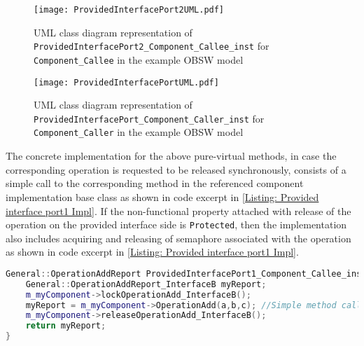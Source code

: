 \begin{figure}[h]
	\centering
	\texttt{[image: ProvidedInterfacePort2UML.pdf]}
	\caption{UML class diagram representation of \texttt{Provided\allowbreak Interface\allowbreak Port2\allowbreak\_Component\allowbreak\_Callee\allowbreak\_inst} for \texttt{Component\allowbreak\_Callee} in the example OBSW model}
	\label{fig: Provided interface port2 UML}
\end{figure}

\begin{figure}[h]
	\centering
	\texttt{[image: ProvidedInterfacePortUML.pdf]}
	\caption{UML class diagram representation of \texttt{Provided\allowbreak Interface\allowbreak Port\allowbreak\_Component\allowbreak\_Caller\allowbreak\_inst} for \texttt{Component\allowbreak\_Caller} in the example OBSW model}
	\label{fig: Provided interface port UML}
\end{figure}   

The concrete implementation for the above pure-virtual methods, in case the corresponding operation is requested to be released synchronously, consists of a simple call to the corresponding method in the referenced component implementation base class as shown in code excerpt in \cref{Listing: Provided interface port1 Impl}. If the non-functional property attached with release of the operation on the provided interface side is \texttt{Protected}, then the implementation also includes acquiring and releasing of semaphore associated with the operation as shown in code excerpt in \cref{Listing: Provided interface port1 Impl}. 

\begin{Listing}
\begin{lstlisting}[language=C++]
General::OperationAddReport ProvidedInterfacePort1_Component_Callee_inst::OperationAdd (const IntegerType& a,const IntegerType& b,IntegerType& c) {
	General::OperationAddReport_InterfaceB myReport;
	m_myComponent->lockOperationAdd_InterfaceB();
	myReport = m_myComponent->OperationAdd(a,b,c); //Simple method call
	m_myComponent->releaseOperationAdd_InterfaceB();
	return myReport;
}
\end{lstlisting}
\caption{Code excerpt from the generated code for operation \texttt{OperationAdd} access in \texttt{Provided\allowbreak Interface\allowbreak Port1\_\allowbreak Component\_\allowbreak Callee\_\allowbreak inst} which is called synchronously and has \texttt{Protected} as a non-functional property attached to it}
\label{Listing: Provided interface port1 Impl}
\end{Listing}

